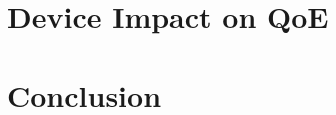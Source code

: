 \documentclass[12pt]{cmuthesis}
\begin{document}
\chapter{Device Impact on QoE}








\chapter{Conclusion}


\backmatter

\renewcommand{\bibsection}{\chapter{\bibname}}

\end{document}
